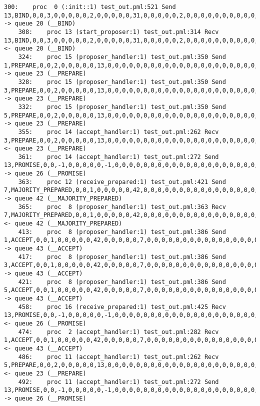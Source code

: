 \begin{lstlisting}[xleftmargin=.01\linewidth, xrightmargin=0.01\linewidth, caption={Message passing caused by the proposer's protocol bug.}, label={lst:paxos_bug}]
    300:    proc  0 (:init::1) test_out.pml:521 Send 13,BIND,0,0,3,0,0,0,0,0,2,0,0,0,0,0,31,0,0,0,0,0,2,0,0,0,0,0,0,0,0,0,0,0,0,0,0,0       -> queue 20 (__BIND)
    308:    proc 13 (start_proposer:1) test_out.pml:314 Recv 13,BIND,0,0,3,0,0,0,0,0,2,0,0,0,0,0,31,0,0,0,0,0,2,0,0,0,0,0,0,0,0,0,0,0,0,0,0,0       <- queue 20 (__BIND)
    324:    proc 15 (proposer_handler:1) test_out.pml:350 Send 1,PREPARE,0,0,2,0,0,0,0,0,13,0,0,0,0,0,0,0,0,0,0,0,0,0,0,0,0,0,0,0,0,0,0,0,0,0,0,0   -> queue 23 (__PREPARE)
    328:    proc 15 (proposer_handler:1) test_out.pml:350 Send 3,PREPARE,0,0,2,0,0,0,0,0,13,0,0,0,0,0,0,0,0,0,0,0,0,0,0,0,0,0,0,0,0,0,0,0,0,0,0,0   -> queue 23 (__PREPARE)
    332:    proc 15 (proposer_handler:1) test_out.pml:350 Send 5,PREPARE,0,0,2,0,0,0,0,0,13,0,0,0,0,0,0,0,0,0,0,0,0,0,0,0,0,0,0,0,0,0,0,0,0,0,0,0   -> queue 23 (__PREPARE)
    355:    proc 14 (accept_handler:1) test_out.pml:262 Recv 3,PREPARE,0,0,2,0,0,0,0,0,13,0,0,0,0,0,0,0,0,0,0,0,0,0,0,0,0,0,0,0,0,0,0,0,0,0,0,0     <- queue 23 (__PREPARE)
    361:    proc 14 (accept_handler:1) test_out.pml:272 Send 13,PROMISE,0,0,-1,0,0,0,0,0,-1,0,0,0,0,0,0,0,0,0,0,0,0,0,0,0,0,0,0,0,0,0,0,0,0,0,0,0   -> queue 26 (__PROMISE)
    363:    proc 12 (receive_prepared:1) test_out.pml:421 Send 7,MAJORITY_PREPARED,0,0,1,0,0,0,0,0,42,0,0,0,0,0,0,0,0,0,0,0,0,0,0,0,0,0,0,0,0,0,0,0,0,0,0,0 -> queue 42 (__MAJORITY_PREPARED)
    365:    proc  8 (proposer_handler:1) test_out.pml:363 Recv 7,MAJORITY_PREPARED,0,0,1,0,0,0,0,0,42,0,0,0,0,0,0,0,0,0,0,0,0,0,0,0,0,0,0,0,0,0,0,0,0,0,0,0 <- queue 42 (__MAJORITY_PREPARED)
    413:    proc  8 (proposer_handler:1) test_out.pml:386 Send 1,ACCEPT,0,0,1,0,0,0,0,0,42,0,0,0,0,0,7,0,0,0,0,0,0,0,0,0,0,0,0,0,0,0,0,0,0,0,0,0    -> queue 43 (__ACCEPT)
    417:    proc  8 (proposer_handler:1) test_out.pml:386 Send 3,ACCEPT,0,0,1,0,0,0,0,0,42,0,0,0,0,0,7,0,0,0,0,0,0,0,0,0,0,0,0,0,0,0,0,0,0,0,0,0    -> queue 43 (__ACCEPT)
    421:    proc  8 (proposer_handler:1) test_out.pml:386 Send 5,ACCEPT,0,0,1,0,0,0,0,0,42,0,0,0,0,0,7,0,0,0,0,0,0,0,0,0,0,0,0,0,0,0,0,0,0,0,0,0    -> queue 43 (__ACCEPT)
    458:    proc 16 (receive_prepared:1) test_out.pml:425 Recv 13,PROMISE,0,0,-1,0,0,0,0,0,-1,0,0,0,0,0,0,0,0,0,0,0,0,0,0,0,0,0,0,0,0,0,0,0,0,0,0,0 <- queue 26 (__PROMISE)
    474:    proc  2 (accept_handler:1) test_out.pml:282 Recv 1,ACCEPT,0,0,1,0,0,0,0,0,42,0,0,0,0,0,7,0,0,0,0,0,0,0,0,0,0,0,0,0,0,0,0,0,0,0,0,0      <- queue 43 (__ACCEPT)
    486:    proc 11 (accept_handler:1) test_out.pml:262 Recv 5,PREPARE,0,0,2,0,0,0,0,0,13,0,0,0,0,0,0,0,0,0,0,0,0,0,0,0,0,0,0,0,0,0,0,0,0,0,0,0     <- queue 23 (__PREPARE)
    492:    proc 11 (accept_handler:1) test_out.pml:272 Send 13,PROMISE,0,0,-1,0,0,0,0,0,-1,0,0,0,0,0,0,0,0,0,0,0,0,0,0,0,0,0,0,0,0,0,0,0,0,0,0,0   -> queue 26 (__PROMISE)

\end{lstlisting}
